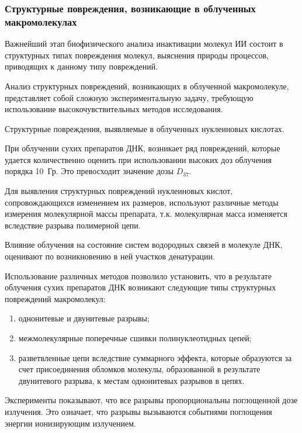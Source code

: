 \documentclass[a4paper, 14pt]{article}
\begin{document}
\subsubsection{Структурные повреждения, возникающие в облученных
макромолекулах}
Важнейший этап биофизического анализа инактивации молекул ИИ состоит в
структурных типах повреждения молекул, выяснения природы процессов,
приводящих к данному типу повреждений.

Анализ структурных повреждений, возникающих в облученной макромолекуле,
представляет собой сложную экспериментальную задачу, требующую использование
высокочувствительных методов исследования.

Структурные повреждения, выявляемые в облученных нуклеиновых кислотах.

При облучении сухих препаратов ДНК, возникает ряд повреждений, которые
удается количественно оценить при использовании высоких доз облучения порядка 10~Гр. Это превосходит значение дозы $D_{37}$.

Для выявления структурных повреждений нуклеиновых кислот,
сопровождающихся изменением их размеров, используют различные методы
измерения молекулярной массы препарата, т.к. молекулярная масса изменяется
вследствие разрыва полимерной цепи.

Влияние облучения на состояние систем водородных связей в молекуле ДНК,
оценивают по возникновению в ней участков денатурации.

Использование различных методов позволило установить, что в результате облучения сухих препаратов ДНК возникают следующие типы структурных
повреждений макромолекул:
\begin{enumerate}
    \item однонитевые и двунитевые разрывы;
    \item межмолекулярные поперечные сшивки полинуклеотидных цепей;
    \item разветвленные цепи вследствие суммарного эффекта, которые образуются за счет присоединения обломков молекулы, образованной в результате двунитевого
    разрыва, к местам однонитевых разрывов в цепях.
\end{enumerate}
Эксперименты показывают, что все разрывы пропорциональны поглощенной
дозе излучения. Это означает, что разрывы вызываются событиями поглощения
энергии ионизирующим излучением.
\end{document}
